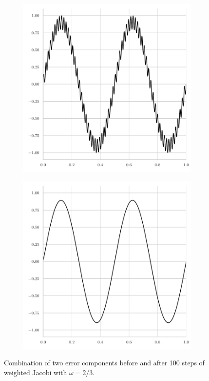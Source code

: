 \begin{figure}
	\begin{subfigure}[b]{0.45\textwidth}
	\centering
	\includegraphics[width=\textwidth]{figures/jacobi_initial_error6.pdf}
\end{subfigure}
\hfill
\begin{subfigure}[b]{0.45\textwidth}
	\centering
	\includegraphics[width=\textwidth]{figures/jacobi_final_error6.pdf}
\end{subfigure}
	\caption{Combination of two error components before and after 100 steps of weighted Jacobi with $\omega = 2/3$.}
\label{fig:combined-error-jacobi}
\end{figure}


